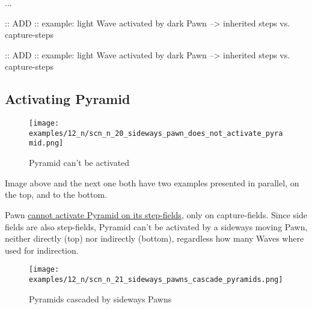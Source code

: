 \vspace*{-0.5\baselineskip}
...

\TODO :: ADD :: example: light Wave activated by dark Pawn --> inherited steps vs. capture-steps

\clearpage %

\TODO :: ADD :: example: light Wave activated by dark Pawn --> inherited steps vs. capture-steps

\clearpage %

\subsection*{Activating Pyramid}
\label{sec:Nineteen/Sideways Pawns/Activating Pyramid}

\vspace*{-1.4\baselineskip}
\noindent
\begin{figure}[!h]
\texttt{[image: examples/12\_n/scn\_n\_20\_sideways\_pawn\_does\_not\_activate\_pyramid.png]}
\vspace*{-1.3\baselineskip}
\caption{Pyramid can't be activated}
\label{fig:scn_n_20_sideways_pawn_does_not_activate_pyramid}
\end{figure}

\vspace*{-0.3\baselineskip}
Image above and the next one both have two examples presented in parallel, on the
top, and to the bottom.

Pawn
\hyperref[fig:scn_mv_38_activating_pyramid_by_pawn]{cannot activate Pyramid on its step-fields},
only on capture-fields.
Since side fields are also step-fields, Pyramid can't be activated by a sideways
moving Pawn, neither directly (top) nor indirectly (bottom), regardless how many
Waves where used for indirection.

\clearpage %

\vspace*{-2.1\baselineskip}
\noindent
\begin{figure}[!h]
\texttt{[image: examples/12\_n/scn\_n\_21\_sideways\_pawns\_cascade\_pyramids.png]}
\caption{Pyramids cascaded by sideways Pawns}
\label{fig:scn_n_21_sideways_pawns_cascade_pyramids}
\end{figure}

